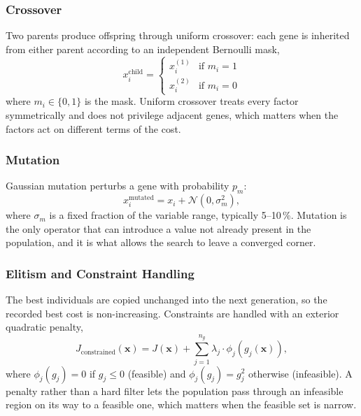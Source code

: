 \subsubsection{Crossover}
Two parents produce offspring through uniform crossover: each gene is inherited from either parent according to an independent Bernoulli mask,
\begin{equation}
    x_i^{\text{child}} = \begin{cases} x_i^{(1)} & \text{if } m_i = 1 \\ x_i^{(2)} & \text{if } m_i = 0 \end{cases}
    \label{eq:crossover}
\end{equation}
\noindent where $m_i \in \{0, 1\}$ is the mask. Uniform crossover treats every factor symmetrically and does not privilege adjacent genes, which matters when the factors act on different terms of the cost.

\subsubsection{Mutation}
Gaussian mutation perturbs a gene with probability $p_m$:
\begin{equation}
    x_i^{\text{mutated}} = x_i + \mathcal{N}(0, \sigma_m^2),
    \label{eq:mutation}
\end{equation}
\noindent where $\sigma_m$ is a fixed fraction of the variable range, typically 5--10\,\%. Mutation is the only operator that can introduce a value not already present in the population, and it is what allows the search to leave a converged corner.

\subsubsection{Elitism and Constraint Handling}
The best individuals are copied unchanged into the next generation, so the recorded best cost is non-increasing. Constraints are handled with an exterior quadratic penalty,
\begin{equation}
    J_{\text{constrained}}(\mathbf{x}) = J(\mathbf{x}) + \sum_{j=1}^{n_g} \lambda_j \cdot \phi_j\!\left(g_j(\mathbf{x})\right),
    \label{eq:penalty_lit}
\end{equation}
\noindent where $\phi_j(g_j) = 0$ if $g_j \leq 0$ (feasible) and $\phi_j(g_j) = g_j^2$ otherwise (infeasible). A penalty rather than a hard filter lets the population pass through an infeasible region on its way to a feasible one, which matters when the feasible set is narrow.

